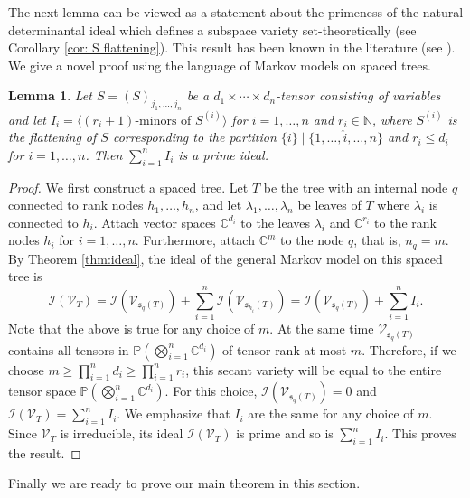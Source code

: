 \documentclass[12pt]{article}
\newtheorem{lemma}[theorem]{Lemma}
\theoremstyle{definition}
\numberwithin{theorem}{section}
\newcommand{\PP}{\mathbb{P}}
\newcommand{\CC}{\mathbb{C}}
\newcommand{\NN}{\mathbb{N}}
\begin{document}
The next lemma can be viewed as a statement about the primeness of the natural determinantal ideal which defines a subspace variety  set-theoretically (see Corollary \ref{cor: S flattening}). This result has been known in the literature (see \cite{landsberg2007, oeding2016}). We give a novel proof using the language of Markov models on spaced trees.
 \begin{lemma} \label{lem:sum-of-determinantal}
  Let $S = (S)_{j_1,\ldots, j_n}$ be a $d_1 \times \cdots \times d_n$-tensor consisting of variables and let $I_i = \langle (r_i+1)\textrm{-minors of  } S^{(i)}\rangle$ for $i=1,\ldots, n$ and $r_i \in \NN$, where $S^{(i)}$ is the flattening of $S$
  corresponding to the partition $\{i\} \mid \{1, \ldots, \hat{i}, \ldots, n\}$ and $r_i \leq d_i$ for $i=1,\ldots,n$. Then $\sum_{i=1}^n I_i$ is a prime ideal.
 \end{lemma}
 \begin{proof}
 We first construct a spaced tree. Let $T$ be the tree with an internal node $q$ connected to rank nodes $h_1, \ldots, h_n$, and let $\lambda_1, \ldots, \lambda_n$ be leaves of $T$ where $\lambda_i$ is connected to $h_i$. Attach vector spaces $\CC^{d_i}$ to the leaves $\lambda_i$ and $\CC^{r_i}$ to the rank nodes $h_i$ for $i=1,\ldots,n$. Furthermore, attach $\CC^m$ to the node $q$, that is, $n_q = m$. By Theorem \ref{thm:ideal}, the ideal of 
 the general Markov model on this spaced tree is
 $$ \mathcal{I}(\mathcal{V}_T) =  \mathcal{I}(\mathcal{V}_{\mathfrak{s}_q(T)}) + \sum_{i=1}^n \mathcal{I}(\mathcal{V}_{\mathfrak{s}_{h_i}(T)}) = 
 \mathcal{I}(\mathcal{V}_{\mathfrak{s}_q(T)}) + \sum_{i=1}^n I_i.$$
 Note that the above is true for any choice of $m$. 
 At the same time $\mathcal{V}_{\mathfrak{s}_q(T)}$
 contains all tensors in $\PP(\bigotimes_{i=1}^n \CC^{d_i})$ of tensor rank at most $m$. Therefore, if we choose $m \geq \prod_{i=1}^{n}d_i \geq \prod_{i=1}^n r_i$, this secant variety will be equal to the entire tensor space $\PP(\bigotimes_{i=1}^n \CC^{d_i})$. For this choice, 
 $\mathcal{I}(\mathcal{V}_{\mathfrak{s}_q(T)})=0$ and  $\mathcal{I}(\mathcal{V}_T) = \sum_{i=1}^n I_i$. We emphasize that $I_i$ are the same for any choice of $m$. Since $\mathcal{V}_T$ is irreducible, its ideal $\mathcal{I}(\mathcal{V}_T)$ is prime and so is $\sum_{i=1}^n I_i$. This proves the result.
 \end{proof}


Finally we are ready to prove our main theorem in this section.
\main*
\end{document}
